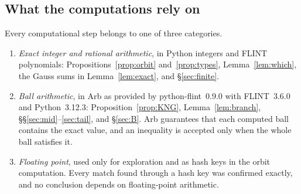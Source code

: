 \documentclass[11pt]{amsart}
\theoremstyle{remark}
\theoremstyle{definition}
\begin{document}
\subsection*{What the computations rely on}
Every computational step belongs to one of three categories.
\begin{enumerate}[leftmargin=2em]
\item \emph{Exact integer and rational arithmetic}, in Python integers and FLINT \cite{flint} polynomials: Propositions~\ref{prop:orbit} and~\ref{prop:types}, Lemma~\ref{lem:which}, the Gauss sums in Lemma~\ref{lem:exact}, and \S\ref{sec:finite}.
\item \emph{Ball arithmetic}, in Arb \cite{arb} as provided by python-flint~0.9.0 with FLINT~3.6.0 and Python~3.12.3: Proposition~\ref{prop:KNG}, Lemma~\ref{lem:branch}, \S\S\ref{sec:mid}--\ref{sec:tail}, and \S\ref{sec:B}. Arb guarantees that each computed ball contains the exact value, and an inequality is accepted only when the whole ball satisfies it.
\item \emph{Floating point}, used only for exploration and as hash keys in the orbit computation. Every match found through a hash key was confirmed exactly, and no conclusion depends on floating-point arithmetic.
\end{enumerate}
\end{document}

